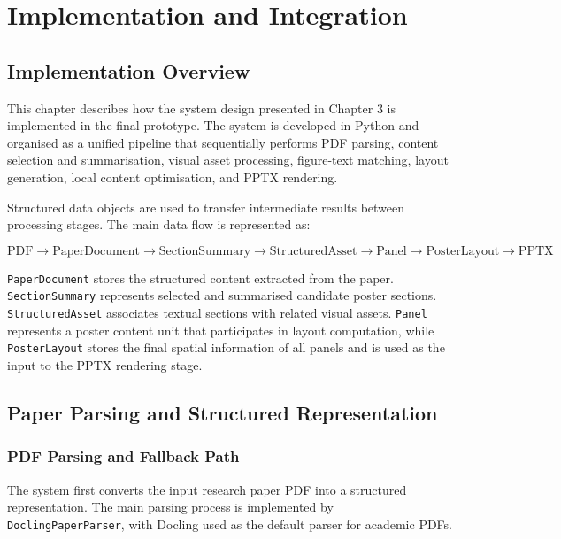 \documentclass[12pt,oneside]{report}
\begin{document}
\chapter{Implementation and Integration}

\section{Implementation Overview}

This chapter describes how the system design presented in Chapter 3 is implemented in the final prototype. The system is developed in Python and organised as a unified pipeline that sequentially performs PDF parsing, content selection and summarisation, visual asset processing, figure-text matching, layout generation, local content optimisation, and PPTX rendering.

\vspace{1em}

Structured data objects are used to transfer intermediate results between processing stages. The main data flow is represented as:

$$
\mathrm{PDF}
\rightarrow
\mathrm{PaperDocument}
\rightarrow
\mathrm{SectionSummary}
\rightarrow
\mathrm{StructuredAsset}
\rightarrow
\mathrm{Panel}
\rightarrow
\mathrm{PosterLayout}
\rightarrow
\mathrm{PPTX}
$$

\texttt{PaperDocument} stores the structured content extracted from the paper. \texttt{SectionSummary} represents selected and summarised candidate poster sections. \texttt{StructuredAsset} associates textual sections with related visual assets. \texttt{Panel} represents a poster content unit that participates in layout computation, while \texttt{PosterLayout} stores the final spatial information of all panels and is used as the input to the PPTX rendering stage.

\section{Paper Parsing and Structured Representation}

\subsection{PDF Parsing and Fallback Path}

The system first converts the input research paper PDF into a structured representation. The main parsing process is implemented by \texttt{DoclingPaperParser}, with Docling used as the default parser for academic PDFs.
\end{document}
